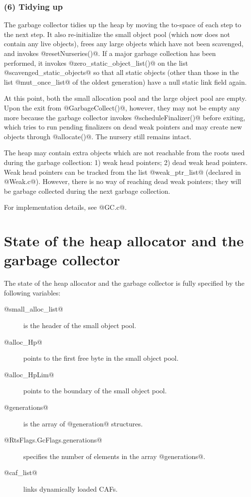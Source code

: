 \documentclass{article}
\begin{document}
\subsubsection{(6) Tidying up}

The garbage collector tidies up the heap by 
moving the to-space of each step to the next step. 
It also re-initialize the small object pool (which now does not contain
any live objects), frees any large objects which have not been scavenged,
and invokes @resetNurseries()@.
If a major garbage collection has been performed, it 
invokes @zero_static_object_list()@ on the list @scavenged_static_objects@ 
so that all static objects
(other than those in the list @mut_once_list@ of the oldest generation)
have a null static link field again.

At this point, both the small allocation pool and the large object pool are
empty. Upon the exit from @GarbageCollect()@, however, they may not
be empty any more because the garbage collector invokes @scheduleFinalizer()@
before exiting, which tries to run pending finalizers on dead weak pointers and 
may create new objects through @allocate()@.
The nursery still remains intact.

The heap may contain extra objects which are not reachable from the roots
used during the garbage collection: 1) weak head pointers; 2) dead
weak head pointers. Weak head pointers can be tracked from 
the list @weak_ptr_list@ (declared in @Weak.c@). However, there is no way
of reaching dead weak pointers; they will be garbage collected during the
next garbage collection.

For implementation details, see @GC.c@.

\section{State of the heap allocator and the garbage collector}

The state of the heap allocator and the garbage collector is fully specified by the 
following variables:

\begin{description}
\item[@small\_alloc\_list@] is the header of the small object pool.
\item[@alloc\_Hp@] points to the first free byte in the small object pool.
\item[@alloc\_HpLim@] points to the boundary of the small object pool.
\item[@generations@] is the array of @generation@ structures.
\item[@RtsFlags.GcFlags.generations@] specifies the number of elements in 
the array @generations@.
\item[@caf\_list@] links dynamically loaded CAFs.
\end{description}
\end{document}
